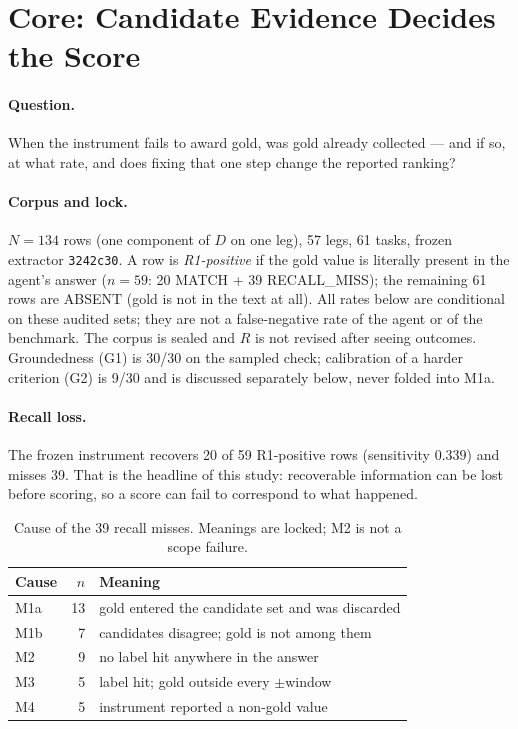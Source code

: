 \documentclass[sigconf,anonymous]{aamas}
\begin{document}
\section{Core: Candidate Evidence Decides the Score}
\label{sec:s3}

\paragraph{Question.}
When the instrument fails to award gold, was gold already collected --- and if so, at what rate, and does fixing that one step change the reported ranking?

\paragraph{Corpus and lock.}
$N=134$ rows (one component of $D$ on one leg), 57 legs, 61 tasks, frozen extractor \texttt{3242c30}.
A row is \emph{R1-positive} if the gold value is literally present in the agent's answer ($n=59$: 20 MATCH + 39 RECALL\_MISS); the remaining 61 rows are ABSENT (gold is not in the text at all).
All rates below are conditional on these audited sets; they are not a false-negative rate of the agent or of the benchmark.
The corpus is sealed and $R$ is not revised after seeing outcomes.
Groundedness (G1) is 30/30 on the sampled check; calibration of a harder criterion (G2) is 9/30 and is discussed separately below, never folded into M1a.

\paragraph{Recall loss.}
The frozen instrument recovers 20 of 59 R1-positive rows (sensitivity $0.339$) and misses 39.
That is the headline of this study: recoverable information can be lost before scoring, so a score can fail to correspond to what happened.

\begin{table}[t]
\centering
\caption{Cause of the 39 recall misses. Meanings are locked; M2 is not a scope failure.}
\label{tab:causes}
\small
\begin{tabular}{lrl}
\toprule
Cause & $n$ & Meaning \\
\midrule
M1a & 13 & gold entered the candidate set and was discarded \\
M1b &  7 & candidates disagree; gold is not among them \\
M2  &  9 & no label hit anywhere in the answer \\
M3  &  5 & label hit; gold outside every $\pm$window \\
M4  &  5 & instrument reported a non-gold value \\
\bottomrule
\end{tabular}
\end{table}
\end{document}
